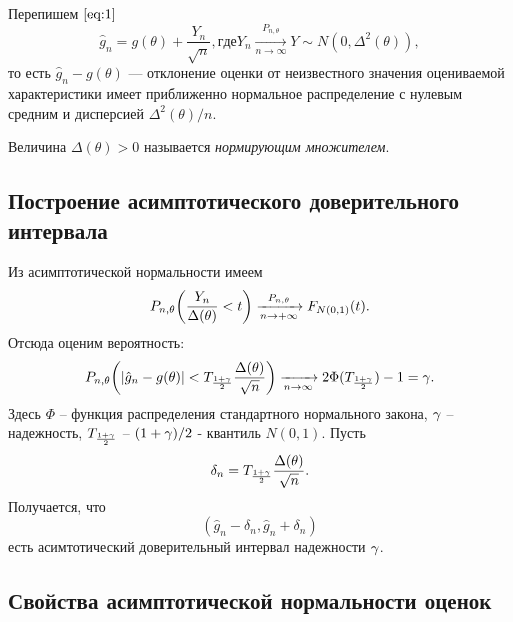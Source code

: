 Перепишем $\ref{eq:1}$
\[
    \hat{g}_n = g(\theta) + \frac{Y_n}{\sqrt{n}}, где Y_n \xrightarrow[n \to \infty]{P_{n, \theta}} Y \sim N(0, \Delta^2(\theta))
,\] то есть
$\hat{g}_n - g(\theta)$ — отклонение оценки от неизвестного значения
оцениваемой характеристики имеет приближенно нормальное распределение
с нулевым средним и дисперсией $\Delta^2(\theta)/n$.

\begin{definition}
    Величина $\Delta(\theta) > 0$ называется \textit{нормирующим множителем}.
\end{definition}

\subsection{Построение асимптотического доверительного интервала}
  Из асимптотической нормальности имеем
    \[
        P_{n, \theta}\parens*{\frac{Y_n}{\Delta(\theta)} < t}
        \xrightarrow[n \to +\infty]{P_{n, \theta}} F_{N(0, 1)}(t)
    .\]
    Отсюда оценим вероятность:
    \[
        P_{n, \theta}\parens*{|\hat{g}_n - g(\theta)| <
        T_{\frac{1 + \g}{2}}\frac{\Delta(\theta)}{\sqrt{n}}} \xrightarrow[n \to \infty]{} 2 \Phi(T_{\frac{1 + \g}{2}}) - 1 = \gamma
    .\]
    Здесь $\Phi$ -- функция распределения стандартного нормального закона, $\gamma$ -- надежность, $T_{\frac{1 + \gamma}{2}}$ -- $(1 + \gamma)/2$ - квантиль $N(0, 1)$. Пусть
    \[
        \delta_n = T_{\frac{1 + \gamma}{2}} \frac{\Delta(\theta)}{\sqrt{n}}
    .\]
    Получается, что
    \[
        (\hat{g}_n - \delta_n, \hat{g}_n + \delta_n)
    \]
    есть асимтотический доверительный интервал надежности $\gamma$.

\subsection{Свойства асимптотической нормальности оценок}

